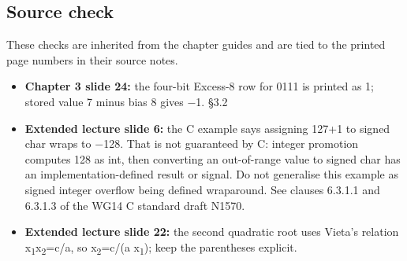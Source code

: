 \documentclass[11pt]{article}
\begin{document}
\begin{keepsection}
\section{Source check}

These checks are inherited from the chapter guides and are tied to the printed page numbers in their source notes.

\begin{itemize}
\item \textbf{Chapter 3 slide 24:} the four-bit Excess-8 row for 0111 is printed as 1; stored value 7 minus bias 8 gives \ensuremath{-}1. \hfill{\small\color{FAUblue}§3.2}
\item \textbf{Extended lecture slide 6:} the C example says assigning 127+1 to signed char wraps to \ensuremath{-}128. That is not guaranteed by C: integer promotion computes 128 as int, then converting an out-of-range value to signed char has an implementation-defined result or signal. Do not generalise this example as signed integer overflow being defined wraparound. See clauses 6.3.1.1 and 6.3.1.3 of the WG14 C standard draft N1570.
\item \textbf{Extended lecture slide 22:} the second quadratic root uses Vieta’s relation x\textsubscript{1}x\textsubscript{2}=c/a, so x\textsubscript{2}=c/(a x\textsubscript{1}); keep the parentheses explicit.
\end{itemize}
\end{keepsection}

\clearpage
\end{document}
